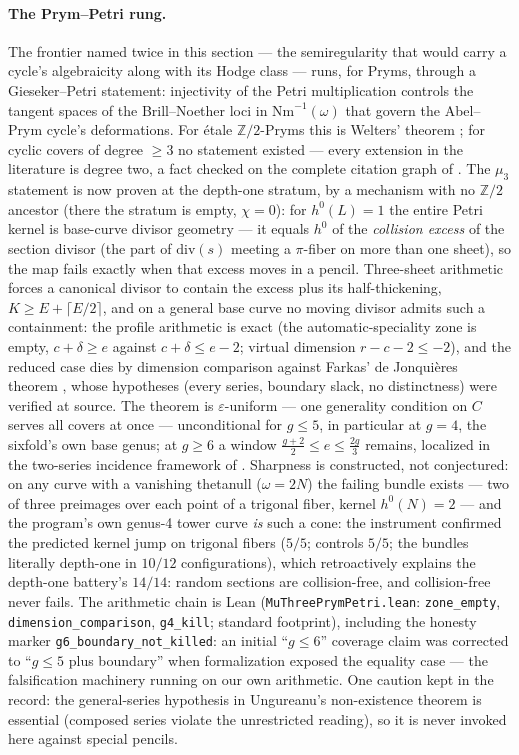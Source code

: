 \documentclass[11pt]{article}
\theoremstyle{definition}
\theoremstyle{remark}
\begin{document}
\paragraph{The Prym--Petri rung.} The frontier named twice in this section
--- the semiregularity that would carry a cycle's algebraicity along with
its Hodge class --- runs, for Pryms, through a Gieseker--Petri statement:
injectivity of the Petri multiplication controls the tangent spaces of the
Brill--Noether loci in $\mathrm{Nm}^{-1}(\omega)$ that govern the
Abel--Prym cycle's deformations. For \'etale $\mathbb Z/2$-Pryms this is
Welters' theorem \cite{WeltersGP}; for cyclic covers of degree $\ge3$ no
statement existed --- every extension in the literature is degree two, a
fact checked on the complete citation graph of \cite{WeltersGP}. The
$\mu_3$ statement is now proven at the depth-one stratum, by a mechanism
with no $\mathbb Z/2$ ancestor (there the stratum is empty, $\chi=0$): for
$h^0(L)=1$ the entire Petri kernel is base-curve divisor geometry --- it
equals $h^0$ of the \emph{collision excess} of the section divisor (the
part of $\mathrm{div}(s)$ meeting a $\pi$-fiber on more than one sheet), so
the map fails exactly when that excess moves in a pencil. Three-sheet
arithmetic forces a canonical divisor to contain the excess plus its
half-thickening, $K\ge E+\lceil E/2\rceil$, and on a general base curve no
moving divisor admits such a containment: the profile arithmetic is exact
(the automatic-speciality zone is empty, $c+\delta\ge e$ against
$c+\delta\le e-2$; virtual dimension $r-c-2\le-2$), and the reduced case
dies by dimension comparison against Farkas' de Jonqui\`eres theorem
\cite{FarkasDJ}, whose hypotheses (every series, boundary slack, no
distinctness) were verified at source. The theorem is
$\varepsilon$-uniform --- one generality condition on $C$ serves all covers
at once --- unconditional for $g\le5$, in particular at $g=4$, the
sixfold's own base genus; at $g\ge6$ a window
$\frac{g+2}{2}\le e\le\frac{2g}{3}$ remains, localized in the two-series
incidence framework of \cite{UngureanuSec}. Sharpness is constructed, not
conjectured: on any curve with a vanishing thetanull ($\omega=2N$) the
failing bundle exists --- two of three preimages over each point of a
trigonal fiber, kernel $h^0(N)=2$ --- and the program's own genus-4 tower
curve \emph{is} such a cone: the instrument confirmed the predicted kernel
jump on trigonal fibers ($5/5$; controls $5/5$; the bundles literally
depth-one in $10/12$ configurations), which retroactively explains the
depth-one battery's $14/14$: random sections are collision-free, and
collision-free never fails. The arithmetic chain is Lean
(\texttt{MuThreePrymPetri.lean}: \texttt{zone\_empty},
\texttt{dimension\_comparison}, \texttt{g4\_kill}; standard footprint),
including the honesty marker \texttt{g6\_boundary\_not\_killed}: an initial
``$g\le6$'' coverage claim was corrected to ``$g\le5$ plus boundary'' when
formalization exposed the equality case --- the falsification machinery
running on our own arithmetic. One caution kept in the record: the
general-series hypothesis in Ungureanu's non-existence theorem
\cite{UngureanuDim} is essential (composed series violate the unrestricted
reading), so it is never invoked here against special pencils.
\end{document}
